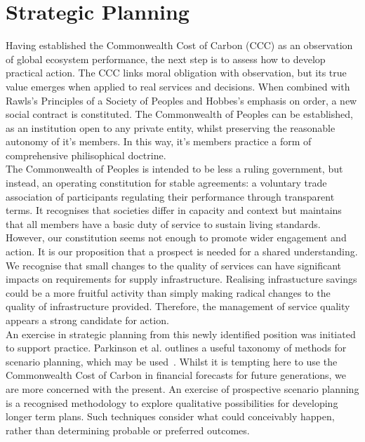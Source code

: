 \documentclass[12pt, oneside]{article}   	%
\begin{document}
\section{Strategic Planning}

Having established the Commonwealth Cost of Carbon (CCC) as an observation of global ecosystem performance, the next step is to assess how to develop practical action.
The CCC links moral obligation with observation, but its true value emerges when applied to real services and decisions.
When combined with Rawls’s Principles of a Society of Peoples and Hobbes’s emphasis on order, a new social contract is constituted.
The Commonwealth of Peoples can be established, as an institution open to any private entity, whilst preserving the reasonable autonomy of it's members.
In this way, it's members practice a form of comprehensive philisophical doctrine.\\

The Commonwealth of Peoples is intended to be less a ruling government, but instead, an operating constitution for stable agreements: a voluntary trade association of participants regulating their performance through transparent terms.
It recognises that societies differ in capacity and context but maintains that all members have a basic duty of service to sustain living standards.\\

However, our constitution seems not enough to promote wider engagement and action.
It is our proposition that a prospect is needed for a shared understanding.
We recognise that small changes to the quality of services can have significant impacts on requirements for supply infrastructure.
Realising infrastucture savings could be a more fruitful activity than simply making radical changes to the quality of infrastructure provided.
Therefore, the management of service quality appears a strong candidate for action.\\

An exercise in strategic planning from this newly identified position was initiated to support practice.
Parkinson et al. outlines a useful taxonomy of methods for scenario planning, which may be used~\cite{atp1}.
Whilst it is tempting here to use the Commonwealth Cost of Carbon in financial forecasts for future generations, we are more concerned with the present.
An exercise of prospective scenario planning is a recognised methodology to explore qualitative possibilities for developing longer term plans.
Such techniques consider what could conceivably happen, rather than determining probable or preferred outcomes.\\
\end{document}
